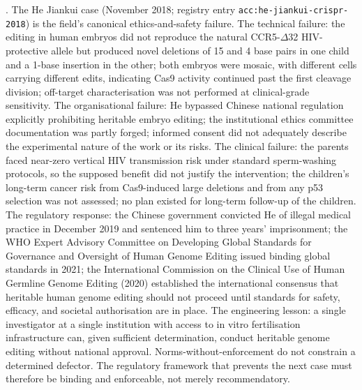 . The He Jiankui
case (November 2018; registry entry
\texttt{acc:he-jiankui-crispr-2018}) is the field's canonical
ethics-and-safety failure. The technical failure: the editing
in human embryos did not reproduce the natural CCR5-$\Delta$32
HIV-protective allele but produced novel deletions of 15 and 4
base pairs in one child and a 1-base insertion in the other; both
embryos were mosaic, with different cells carrying different edits,
indicating Cas9 activity continued past the first cleavage division;
off-target characterisation was not performed at clinical-grade
sensitivity\cite{paper:v6c03-musunuru-2019}. The organisational
failure: He bypassed Chinese national regulation explicitly
prohibiting heritable embryo editing; the institutional ethics
committee documentation was partly forged; informed consent did not
adequately describe the experimental nature of the work or its
risks. The clinical failure: the parents faced near-zero vertical
HIV transmission risk under standard sperm-washing protocols, so
the supposed benefit did not justify the intervention; the
children's long-term cancer risk from Cas9-induced large
deletions and from any p53 selection was not assessed; no plan
existed for long-term follow-up of the children. The regulatory
response: the Chinese government convicted He of illegal medical
practice in December 2019 and sentenced him to three years'
imprisonment; the WHO Expert Advisory Committee on Developing
Global Standards for Governance and Oversight of Human Genome
Editing issued binding global standards in 2021; the International
Commission on the Clinical Use of Human Germline Genome Editing
(2020) established the international consensus that heritable
human genome editing should not proceed until standards for safety,
efficacy, and societal authorisation are in place. The engineering
lesson: a single investigator at a single institution with access
to in vitro fertilisation infrastructure can, given sufficient
determination, conduct heritable genome editing without national
approval. Norms-without-enforcement do not constrain a determined
defector. The regulatory framework that prevents the next case
must therefore be binding and enforceable, not merely
recommendatory\cite[pp.~127--132]{text:v6c09-nas-heritable-editing-2020}.

